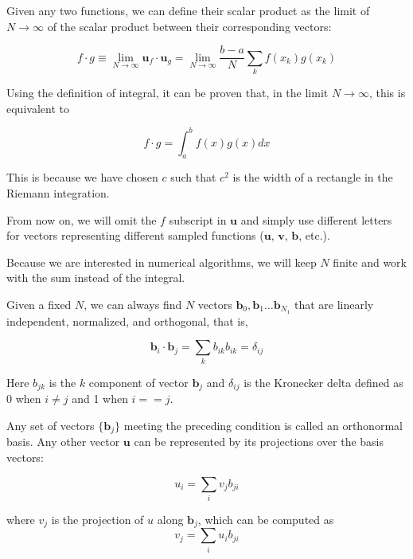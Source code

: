 \documentclass[justified,sixbynine]{tufte-book}
\theoremstyle{plain}%
\theoremstyle{definition}
\theoremstyle{remark}
\begin{document}
\begin{fullwidth}
Given any two functions, we can define their scalar product as the limit of $N\rightarrow\infty$ of the scalar product between their corresponding vectors:

\begin{equation}
f \cdot g \equiv \lim_{N\rightarrow\infty} \mathbf{u}_f \cdot \mathbf{u}_g =
\lim_{N\rightarrow\infty} \frac{b-a}{N} \sum_k f(x_k) g(x_k)
\end{equation}

Using the definition of integral, it can be proven that, in the limit $N\rightarrow\infty$, this is equivalent to

\begin{equation}
f \cdot g = \int_a^b f(x) g(x) dx
\end{equation}

This is because we have chosen $c$ such that $c^2$ is the width of a rectangle in the Riemann integration.

From now on, we will omit the $f$ subscript in $\mathbf{u}$ and simply use different letters for vectors representing different sampled functions ($\mathbf{u}$, $\mathbf{v}$, $\mathbf{b}$, etc.).

Because we are interested in numerical algorithms, we will keep $N$ finite and work with the sum instead of the integral.

Given a fixed $N$, we can always find $N$ vectors $\mathbf{b}_0,\mathbf{b}_1\dots\mathbf{b}_{N_1}$ that are linearly independent, normalized, and orthogonal, that is,

\begin{equation}
\mathbf{b}_i \cdot \mathbf{b}_j = \sum_k b_{ik} b_{ik} = \delta_{ij}
\end{equation}

Here $b_{jk}$ is the $k$ component of vector $\mathbf{b}_j$ and $\delta_{ij}$ is the Kronecker delta defined as 0 when $i\neq j$ and 1 when $i==j$.

Any set of vectors $\{\mathbf{b}_j\}$ meeting the preceding condition is called an orthonormal basis. Any other vector $\mathbf{u}$ can be represented by its projections over the basis vectors:

\begin{equation}
  u_i = \sum_i v_j b_{ji}
\end{equation}

where $v_j$ is the projection of $u$ along $\mathbf{b}_j$, which can be computed as
\begin{equation}
  v_j = \sum_i u_i b_{ji}
\end{equation}


\end{fullwidth}
\end{document}
